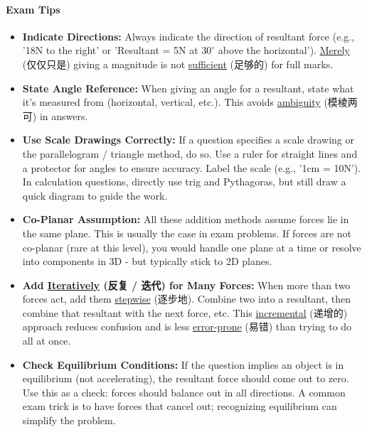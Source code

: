 \paragraph{Exam Tips}
\begin{itemize}
    \item \textbf{Indicate Directions:} Always indicate the direction of resultant force (e.g., '18N to the right' or 'Resultant
    = 5N at $30^\circ$ above the horizontal'). \underline{Merely} (仅仅只是) giving a magnitude is not \underline{sufficient}
    (足够的) for full marks.
    \item \textbf{State Angle Reference:} When giving an angle for a resultant, state what it's measured from (horizontal,
    vertical, etc.). This avoids \underline{ambiguity} (模棱两可) in answers.
    \item \textbf{Use Scale Drawings Correctly:} If a question specifies a scale drawing or the parallelogram / triangle method,
    do so. Use a ruler for straight lines and a protector for angles to ensure accuracy. Label the scale (e.g., '1cm = 10N'). In
    calculation questions, directly use trig and Pythagoras, but still draw a quick diagram to guide the work.
    \item \textbf{Co-Planar Assumption:} All these addition methods assume forces lie in the same plane. This is usually the case
    in exam problems. If forces are not co-planar (rare at this level), you would handle one plane at a time or resolve into
    components in 3D - but typically stick to 2D planes.
    \item \textbf{Add \underline{Iteratively} (反复 / 迭代) for Many Forces:} When more than two forces act, add them
    \underline{stepwise} (逐步地). Combine two into a resultant, then combine that resultant with the next force, etc. This
    \underline{incremental} (递增的) approach reduces confusion and is less \underline{error-prone} (易错) than trying to do all
    at once.
    \item \textbf{Check Equilibrium Conditions:} If the question implies an object is in equilibrium (not accelerating), the
    resultant force should come out to zero. Use this as a check: forces should balance out in all directions. A common exam
    trick is to have forces that cancel out; recognizing equilibrium can simplify the problem.
\end{itemize}